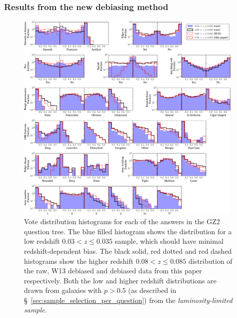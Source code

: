 \documentclass[useAMS,usenatbib]{mn2e}
\begin{document}
\subsubsection{Results from the new debiasing method}
\label{sec:debiasing_results}

\begin{figure}
		\centering

        \includegraphics[width=0.975\textwidth]{Images/Bias/Debiasing/all_histograms.pdf}

        \caption{Vote distribution histograms for each of the answers in the GZ2 question tree. The blue filled histogram shows the distribution for a low redshift $0.03< z \leq 0.035$ sample, which should have minimal redshift-dependent bias. The black solid, red dotted and red dashed histograms show the higher redshift $0.08 < z \leq 0.085$ distribution of the raw, W13 debiased and debiased data from this paper respectively. Both the low and higher redshift distributions are drawn from galaxies with $p>0.5$ (as described in \S~\ref{sec:sample_selection_per_question}) from the \textit{luminosity-limited sample}.}

        \label{fig:all_histograms}

\end{figure}
\end{document}
